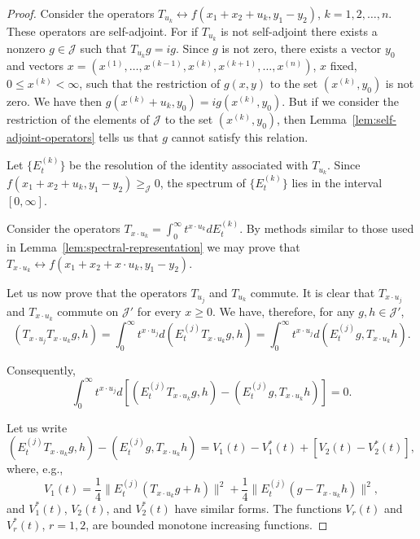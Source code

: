 \documentclass{article}
\begin{document}
\begin{proof}
Consider the operators $T_{u_k} \leftrightarrow f(x_1 + x_2 + u_k, y_1 - y_2)$, $k = 1, 2, \ldots, n$. These operators are self-adjoint. For if $T_{u_k}$ is not self-adjoint there exists a nonzero $g \in \mathcal{J}$ such that $T_{u_k} g = i g$. Since $g$ is not zero, there exists a vector $y_0$ and vectors $x = (x^{(1)}, \ldots, x^{(k-1)}, x^{(k)}, x^{(k+1)}, \ldots, x^{(n)})$, $x$ fixed, $0 \leq x^{(k)} < \infty$, such that the restriction of $g(x,y)$ to the set $(x^{(k)}, y_0)$ is not zero. We have then $g(x^{(k)} + u_k, y_0) = i g(x^{(k)}, y_0)$. But if we consider the restriction of the elements of $\mathcal{J}$ to the set $(x^{(k)}, y_0)$, then Lemma~\ref{lem:self-adjoint-operators} tells us that $g$ cannot satisfy this relation.

Let $\{E_t^{(k)}\}$ be the resolution of the identity associated with $T_{u_k}$. Since $f(x_1 + x_2 + u_k, y_1 - y_2) \geq_{\mathcal{J}} 0$, the spectrum of $\{E_t^{(k)}\}$ lies in the interval $[0, \infty]$.

Consider the operators $T_{x \cdot u_k} = \int_0^{\infty} t^{x \cdot u_k} dE_t^{(k)}$. By methods similar to those used in Lemma~\ref{lem:spectral-representation} we may prove that $T_{x \cdot u_k} \leftrightarrow f(x_1 + x_2 + x \cdot u_k, y_1 - y_2)$.

Let us now prove that the operators $T_{u_j}$ and $T_{u_k}$ commute. It is clear that $T_{x \cdot u_j}$ and $T_{x \cdot u_k}$ commute on $\mathcal{J}'$ for every $x \geq 0$. We have, therefore, for any $g, h \in \mathcal{J}'$,
\begin{equation}
(T_{x \cdot u_j} T_{x \cdot u_k} g, h) = \int_0^{\infty} t^{x \cdot u_j} d(E_t^{(j)} T_{x \cdot u_k} g, h) = \int_0^{\infty} t^{x \cdot u_j} d(E_t^{(j)} g, T_{x \cdot u_k} h).
\label{eq:commutation-step1}
\end{equation}

Consequently,
\begin{equation}
\int_0^{\infty} t^{x \cdot u_j} d[(E_t^{(j)} T_{x \cdot u_k} g, h) - (E_t^{(j)} g, T_{x \cdot u_k} h)] = 0.
\label{eq:commutation-step2}
\end{equation}

Let us write
\begin{equation}
(E_t^{(j)} T_{x \cdot u_k} g, h) - (E_t^{(j)} g, T_{x \cdot u_k} h) = V_1(t) - V_1^*(t) + [V_2(t) - V_2^*(t)],
\label{eq:commutation-decomposition}
\end{equation}
where, e.g.,
\begin{equation}
V_1(t) = \frac{1}{4} \|E_t^{(j)} (T_{x \cdot u_k} g + h)\|^2 + \frac{1}{4} \|E_t^{(j)} (g - T_{x \cdot u_k} h)\|^2,
\label{eq:v1-definition}
\end{equation}
and $V_1^*(t)$, $V_2(t)$, and $V_2^*(t)$ have similar forms. The functions $V_r(t)$ and $V_r^*(t)$, $r = 1, 2$, are bounded monotone increasing functions.


\end{proof}
\end{document}

